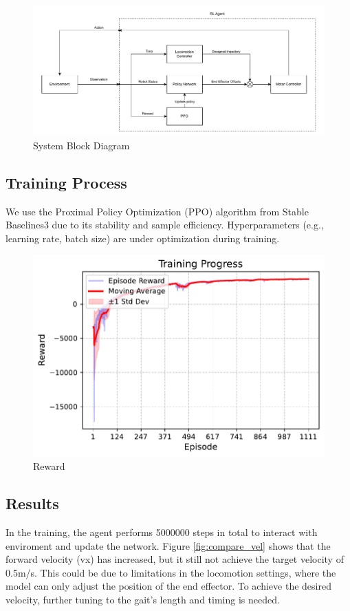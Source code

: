\documentclass[a4paper,11pt]{article}
\begin{document}
\begin{figure}[H]
  \centering
	\includegraphics[width=0.9\linewidth]{../../assets/rl_agent_block_diagram.txt.pdf}
  \caption{System Block Diagram}
  \label{fig:system}
\end{figure}

\subsection{Training Process}

We use the Proximal Policy Optimization (PPO) algorithm from Stable Baselines3 due to its stability and sample efficiency.
Hyperparameters (e.g., learning rate, batch size) are under optimization during training.

\begin{figure}[H]
  \centering
	\includegraphics[width=0.5\linewidth]{../../assets/rl_training_progress.pdf}
  \caption{Reward}
  \label{fig:reward}
\end{figure}

\subsection{Results}

In the training, the agent performs 5000000 steps in total to interact with enviroment and update the network. 
Figure \ref{fig:compare_vel} shows that the forward velocity (vx) has increased, but it still not achieve the target velocity of 0.5m/s.
This could be due to limitations in the locomotion settings, where the model can only adjust the position of the end effector. To achieve the desired velocity, 
further tuning to the gait's length and timing is needed.
\end{document}
